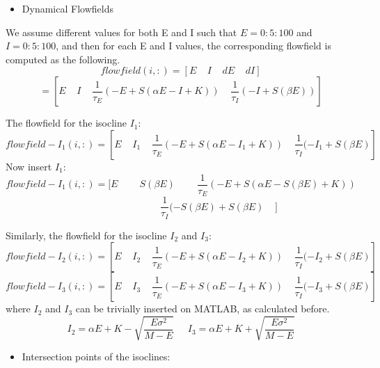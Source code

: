 \documentclass{article}
\begin{document}
\begin{itemize}
 \item Dynamical Flowfields
\end{itemize}
We assume different values for both E and I such that $E=0:5:100$ and $I=0:5:100$, and then for each E and I values, the corresponding flowfield is computed as the following.
\begin{equation*}
flowfield(i,:)=[E\;\;\;\;I\;\;\;\;dE\;\;\;\;dI]
\end{equation*}
\begin{equation*}
 =[E\;\;\;\;I\;\;\;\; \frac{1}{\tau_E}(-E+S(\alpha E-I+K))\;\;\;\; \frac{1}{\tau_I}(-I+S(\beta E))]
\end{equation*}

The flowfield for the isocline $I_1$:
\begin{equation*}
 flowfield-I_1(i,:)=[E\;\;\;\; I_1\;\;\;\;\frac{1}{\tau_E}(-E+S(\alpha E-I_1+K))\;\;\;\; \frac{1}{\tau_I}(-I_1+S(\beta E)]
\end{equation*}
Now insert $I_1$:
\begin{equation*}
 flowfield-I_1(i,:)=[E \;\;\;\;\;\;\;\;S(\beta E)\;\;\;\;\;\;\;\; \frac{1}{\tau_E}(-E+S(\alpha E - S(\beta E)+K))
\end{equation*}
\begin{equation*}
 \;\;\;\;\;\;\;\;\;\;\;\;\;\;\;\;\;\;\;\;\;\;\;\;\;\;\;\; \frac{1}{\tau_I}(-S(\beta E)+S(\beta E)\;\;\;\;]
\end{equation*}

Similarly, the flowfield for the isocline $I_2$ and $I_3$:
\begin{equation*}
 flowfield-I_2(i,:)=[E\;\;\;\; I_2\;\;\;\;\frac{1}{\tau_E}(-E+S(\alpha E-I_2+K))\;\;\;\; \frac{1}{\tau_I}(-I_2+S(\beta E)]
\end{equation*}
\begin{equation*}
 flowfield-I_3(i,:)=[E\;\;\;\; I_3\;\;\;\;\frac{1}{\tau_E}(-E+S(\alpha E-I_3+K))\;\;\;\; \frac{1}{\tau_I}(-I_3+S(\beta E)]
\end{equation*}
where $I_2$ and $I_3$ can be trivially inserted on MATLAB, as calculated before.
\begin{equation*}
I_2=\alpha E+K-\sqrt{\frac{E\sigma^2}{M-E}} \;\;\;\;\; I_3=\alpha E+K+\sqrt{\frac{E\sigma^2}{M-E}}
\end{equation*}

\begin{itemize}
 \item Intersection points of the isoclines:
\end{itemize}
\end{document}

